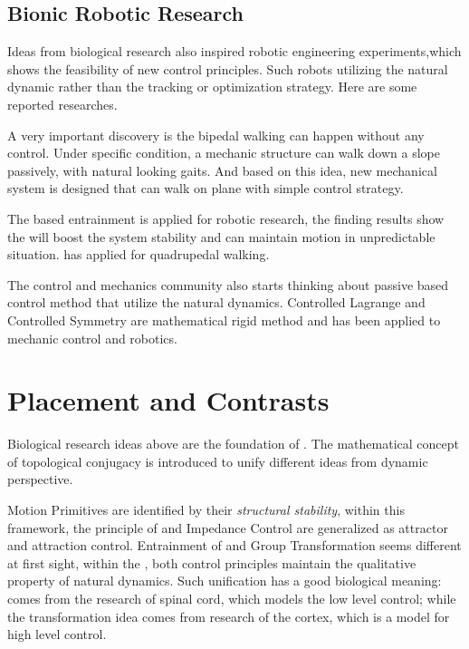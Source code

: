 \subsection{Bionic Robotic Research}
Ideas from biological research  also inspired robotic engineering experiments,which shows the feasibility of new control principles.
Such robots utilizing the natural dynamic rather than the tracking or optimization strategy.
Here are some reported researches.
\begin{itemize}
A very important discovery is the bipedal walking can happen without any control\citep{McGeer1990}.  
Under specific condition, a mechanic structure can walk down a slope passively, with natural looking gaits.
And based on this idea, new mechanical system is designed that can walk on plane with simple control strategy\citep{Collins2005}.

The \cpg based entrainment is applied for robotic research\citep{Williamson1999a}, the finding results show the \cpg will boost the system stability and can maintain motion in unpredictable situation.
\citet{fukuoka2003adaptive} has applied \cpg for quadrupedal walking.

The control and mechanics community also starts thinking about passive based control method that utilize the natural dynamics.
Controlled Lagrange \citep{bloch2000controlled,bloch2001controlled,bloch2000potential}and Controlled Symmetry \citep{spong1998underactuated,Spong96energybased} are mathematical rigid method and has been applied to mechanic control and robotics\citep{spong2005controlled}.
\end{itemize}

\section{Placement and Contrasts}
Biological research ideas above are the foundation of \moit.
The mathematical concept of topological conjugacy is introduced to unify different ideas from dynamic perspective.

Motion Primitives are identified by their \emph{structural stability}, within this framework,
the principle of \eph and Impedance Control are generalized as attractor and attraction control.
Entrainment of \cpg and Group Transformation seems different at first sight, within the \moit, both control principles maintain the qualitative property of natural dynamics.
Such unification has a good biological meaning: \cpg comes from the research of spinal cord, which models the low level control; while the transformation idea comes from research of the cortex, which is a model for high level control.

